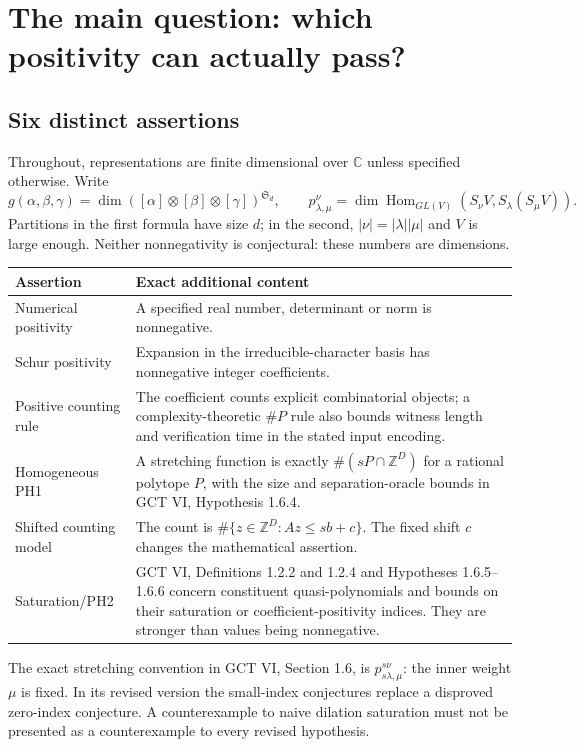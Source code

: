 \section{The main question: which positivity can actually pass?}
\label{sec:positivity}

\subsection{Six distinct assertions}
Throughout, representations are finite dimensional over $\mathbb C$ unless
specified otherwise. Write
\[
 g(\alpha,\beta,\gamma)
 =\dim([\alpha]\otimes[\beta]\otimes[\gamma])^{\mathfrak S_d},
 \qquad
 p_{\lambda,\mu}^{\nu}
 =\dim\operatorname{Hom}_{GL(V)}
     (S_\nu V,S_\lambda(S_\mu V)).
\]
Partitions in the first formula have size $d$; in the second,
$|\nu|=|\lambda||\mu|$ and $V$ is large enough. Neither nonnegativity is
conjectural: these numbers are dimensions.

\begin{center}\small
\begin{tabularx}{\linewidth}{@{}p{.18\linewidth}X@{}}
\toprule
Assertion & Exact additional content\\
\midrule
Numerical positivity & A specified real number, determinant or norm is nonnegative.\\
Schur positivity & Expansion in the irreducible-character basis has
nonnegative integer coefficients.\\
Positive counting rule & The coefficient counts explicit combinatorial
objects; a complexity-theoretic $\#P$ rule also bounds witness length and
verification time in the stated input encoding.\\
Homogeneous PH1 & A stretching function is exactly
$\#(sP\cap\mathbb Z^D)$ for a rational polytope $P$, with the size and
separation-oracle bounds in GCT VI, Hypothesis 1.6.4.\\
Shifted counting model & The count is $\#\{z\in\mathbb Z^D:Az\le sb+c\}$.
The fixed shift $c$ changes the mathematical assertion.\\
Saturation/PH2 & GCT VI, Definitions 1.2.2 and 1.2.4 and
Hypotheses 1.6.5--1.6.6 concern constituent quasi-polynomials and bounds
on their saturation or coefficient-positivity indices. They are stronger
than values being nonnegative.\\
\bottomrule
\end{tabularx}
\end{center}

The exact stretching convention in GCT VI, Section 1.6, is
$p_{s\lambda,\mu}^{s\nu}$: the inner weight $\mu$ is fixed.
In its revised version the small-index conjectures replace a disproved
zero-index conjecture. A counterexample to naive dilation saturation must
not be presented as a counterexample to every revised hypothesis.

